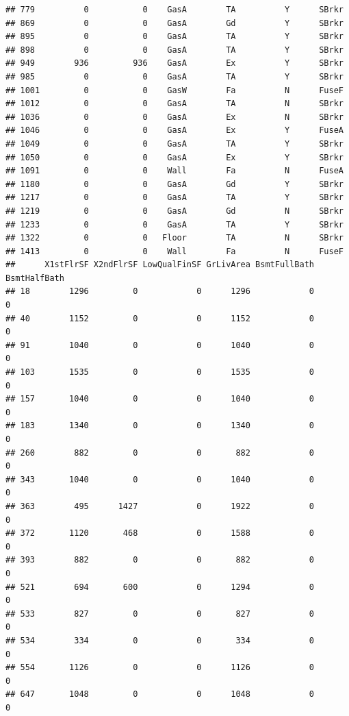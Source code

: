 \documentclass[]{article}
\begin{document}
\begin{verbatim}
## 779          0           0    GasA        TA          Y      SBrkr
## 869          0           0    GasA        Gd          Y      SBrkr
## 895          0           0    GasA        TA          Y      SBrkr
## 898          0           0    GasA        TA          Y      SBrkr
## 949        936         936    GasA        Ex          Y      SBrkr
## 985          0           0    GasA        TA          Y      SBrkr
## 1001         0           0    GasW        Fa          N      FuseF
## 1012         0           0    GasA        TA          N      SBrkr
## 1036         0           0    GasA        Ex          N      SBrkr
## 1046         0           0    GasA        Ex          Y      FuseA
## 1049         0           0    GasA        TA          Y      SBrkr
## 1050         0           0    GasA        Ex          Y      SBrkr
## 1091         0           0    Wall        Fa          N      FuseA
## 1180         0           0    GasA        Gd          Y      SBrkr
## 1217         0           0    GasA        TA          Y      SBrkr
## 1219         0           0    GasA        Gd          N      SBrkr
## 1233         0           0    GasA        TA          Y      SBrkr
## 1322         0           0   Floor        TA          N      SBrkr
## 1413         0           0    Wall        Fa          N      FuseF
##      X1stFlrSF X2ndFlrSF LowQualFinSF GrLivArea BsmtFullBath BsmtHalfBath
## 18        1296         0            0      1296            0            0
## 40        1152         0            0      1152            0            0
## 91        1040         0            0      1040            0            0
## 103       1535         0            0      1535            0            0
## 157       1040         0            0      1040            0            0
## 183       1340         0            0      1340            0            0
## 260        882         0            0       882            0            0
## 343       1040         0            0      1040            0            0
## 363        495      1427            0      1922            0            0
## 372       1120       468            0      1588            0            0
## 393        882         0            0       882            0            0
## 521        694       600            0      1294            0            0
## 533        827         0            0       827            0            0
## 534        334         0            0       334            0            0
## 554       1126         0            0      1126            0            0
## 647       1048         0            0      1048            0            0

\end{verbatim}
\end{document}
